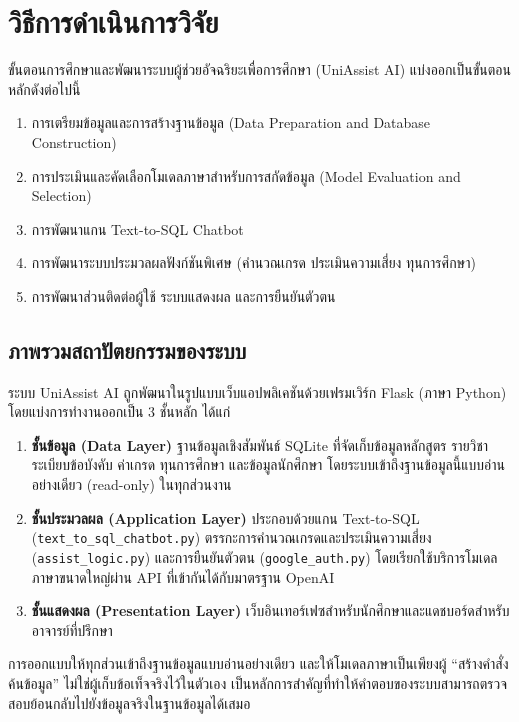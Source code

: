 \chapter{วิธีการดำเนินการวิจัย}
\label{chapter:experiment}

ขั้นตอนการศึกษาและพัฒนาระบบผู้ช่วยอัจฉริยะเพื่อการศึกษา (UniAssist AI) แบ่งออกเป็นขั้นตอนหลักดังต่อไปนี้

\begin{enumerate}
    \item การเตรียมข้อมูลและการสร้างฐานข้อมูล (Data Preparation and Database Construction)
    \item การประเมินและคัดเลือกโมเดลภาษาสำหรับการสกัดข้อมูล (Model Evaluation and Selection)
    \item การพัฒนาแกน Text-to-SQL Chatbot
    \item การพัฒนาระบบประมวลผลฟังก์ชันพิเศษ (คำนวณเกรด ประเมินความเสี่ยง ทุนการศึกษา)
    \item การพัฒนาส่วนติดต่อผู้ใช้ ระบบแสดงผล และการยืนยันตัวตน
\end{enumerate}

\section{ภาพรวมสถาปัตยกรรมของระบบ}

ระบบ UniAssist AI ถูกพัฒนาในรูปแบบเว็บแอปพลิเคชันด้วยเฟรมเวิร์ก Flask (ภาษา Python) โดยแบ่งการทำงานออกเป็น 3 ชั้นหลัก ได้แก่

\begin{enumerate}
    \item \textbf{ชั้นข้อมูล (Data Layer)} ฐานข้อมูลเชิงสัมพันธ์ SQLite ที่จัดเก็บข้อมูลหลักสูตร รายวิชา ระเบียบข้อบังคับ ค่าเกรด ทุนการศึกษา และข้อมูลนักศึกษา โดยระบบเข้าถึงฐานข้อมูลนี้แบบอ่านอย่างเดียว (read-only) ในทุกส่วนงาน
    \item \textbf{ชั้นประมวลผล (Application Layer)} ประกอบด้วยแกน Text-to-SQL (\texttt{text\_to\_sql\_chatbot.py}) ตรรกะการคำนวณเกรดและประเมินความเสี่ยง (\texttt{assist\_logic.py}) และการยืนยันตัวตน (\texttt{google\_auth.py}) โดยเรียกใช้บริการโมเดลภาษาขนาดใหญ่ผ่าน API ที่เข้ากันได้กับมาตรฐาน OpenAI
    \item \textbf{ชั้นแสดงผล (Presentation Layer)} เว็บอินเทอร์เฟซสำหรับนักศึกษาและแดชบอร์ดสำหรับอาจารย์ที่ปรึกษา
\end{enumerate}

การออกแบบให้ทุกส่วนเข้าถึงฐานข้อมูลแบบอ่านอย่างเดียว และให้โมเดลภาษาเป็นเพียงผู้ ``สร้างคำสั่งค้นข้อมูล'' ไม่ใช่ผู้เก็บข้อเท็จจริงไว้ในตัวเอง เป็นหลักการสำคัญที่ทำให้คำตอบของระบบสามารถตรวจสอบย้อนกลับไปยังข้อมูลจริงในฐานข้อมูลได้เสมอ

